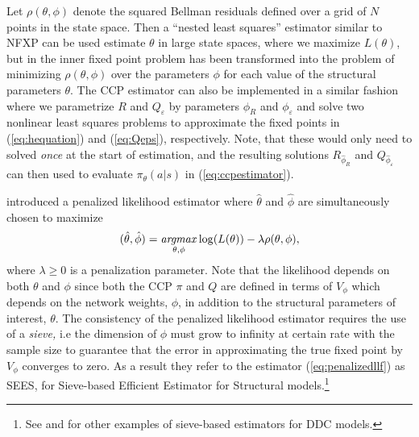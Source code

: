 Let $\rho(\theta,\phi)$ denote the squared Bellman residuals defined over a grid of $N$ points in the state space.
Then a  ``nested least squares'' estimator similar to NFXP can be used estimate $\theta$ in large state
spaces, where we maximize $L(\theta)$, but in the inner fixed point problem has been transformed
into the problem of minimizing $\rho(\theta,\phi)$ over the parameters $\phi$ 
for each value of the structural parameters $\theta$.   The CCP estimator can also be implemented in a similar fashion
where we parametrize $R$ and $Q_\varepsilon$ by parameters $\phi_R$ and $\phi_\varepsilon$ and solve two
nonlinear least squares problems to approximate the fixed points in (\ref{eq:hequation}) and (\ref{eq:Qeps}), respectively.
Note, that these would only need to solved {\it once\/} at the start of estimation, and the resulting solutions
$R_{\hat\phi_R}$ and $Q_{\hat\phi_\varepsilon}$ can then used to evaluate $\pi_\theta(a|s)$  in (\ref{eq:ccpestimator}).

\citet{LuoSang:2024} introduced a penalized likelihood estimator where
$\hat\theta$ and $\hat\phi$ are simultaneously chosen
to  maximize 
\begin{equation}
(\hat\theta,\hat\phi)=\mathop{\it argmax}_{\theta,\phi} \log(L(\theta))-\lambda \rho(\theta,\phi),
\label{eq:penalizedllf}
\end{equation}
where $\lambda \ge 0$ is a penalization
parameter.  Note that the likelihood depends on both $\theta$ and $\phi$ since both the CCP $\pi$ and $Q$
are defined in terms of $V_\phi$ which depends on the network weights, $\phi$, in addition to the structural
parameters of interest, $\theta$. 
The consistency of the penalized likelihood estimator requires the use of a {\it sieve,\/} i.e
the dimension of $\phi$ must grow to infinity at certain rate with the sample
size to guarantee that the error in approximating the true fixed point by $V_\phi$  converges to zero.
As a result they refer to the estimator (\ref{eq:penalizedllf}) as SEES, for Sieve-based Efficient Estimator for Structural models.\footnote{\footnotesize 
See \citet{arcidiacono:2013} and \citet{kristensen:2021} for other examples of sieve-based estimators for DDC models.}

